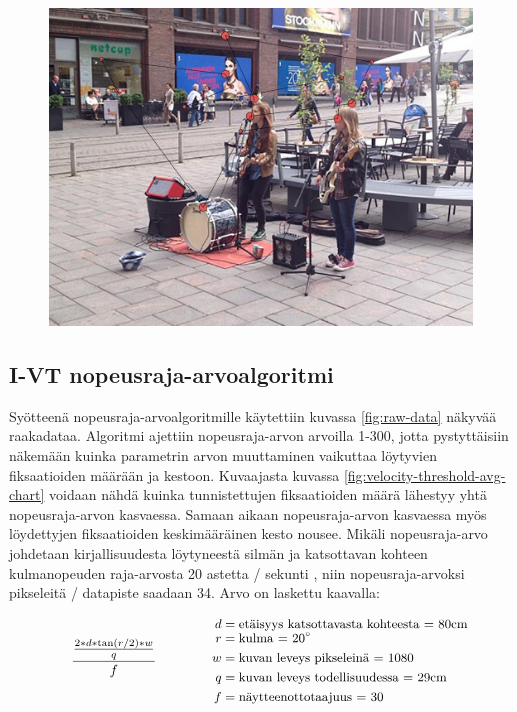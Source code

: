 \begin{figure}[H]
\centering
\begin{minipage}{.6\textwidth}
  \centering
  \includegraphics[width=1\linewidth]{sample-fixations.jpg}
  \label{fig:sample-fixations}
\end{minipage}
\hspace{.5cm}

\end{figure}
 
\subsection{I-VT nopeusraja-arvoalgoritmi}
Syötteenä nopeusraja-arvoalgoritmille käytettiin kuvassa \ref{fig:raw-data} näkyvää raakadataa. Algoritmi ajettiin nopeusraja-arvon arvoilla 1-300, jotta pystyttäisiin näkemään kuinka parametrin arvon muuttaminen vaikuttaa löytyvien fiksaatioiden määrään ja kestoon. Kuvaajasta kuvassa \ref{fig:velocity-threshold-avg-chart} voidaan nähdä kuinka tunnistettujen fiksaatioiden määrä lähestyy yhtä nopeusraja-arvon kasvaessa. Samaan aikaan nopeusraja-arvon kasvaessa myös löydettyjen fiksaatioiden keskimääräinen kesto nousee. Mikäli nopeusraja-arvo johdetaan kirjallisuudesta löytyneestä silmän ja katsottavan kohteen kulmanopeuden raja-arvosta 20 astetta / sekunti \citep[s. 73]{salvucci2000}, niin nopeusraja-arvoksi pikseleitä / datapiste saadaan 34. Arvo on laskettu kaavalla: 

\begin{equation}
{{{2 * d * \tan (r / 2)} * w \over q} \over f} \qquad
\qquad\parbox{6.0cm}{\footnotesize$\begin{aligned} d &= \text{etäisyys katsottavasta kohteesta = 80cm}\\[-1.0ex] r &= \text{kulma = 20\degree}\\w &= \text{kuvan leveys pikseleinä = 1080} \\ q &= \text{kuvan leveys todellisuudessa = 29cm}\\ f &= \text{näytteenottotaajuus = 30} \end{aligned}$}	
\end{equation}

